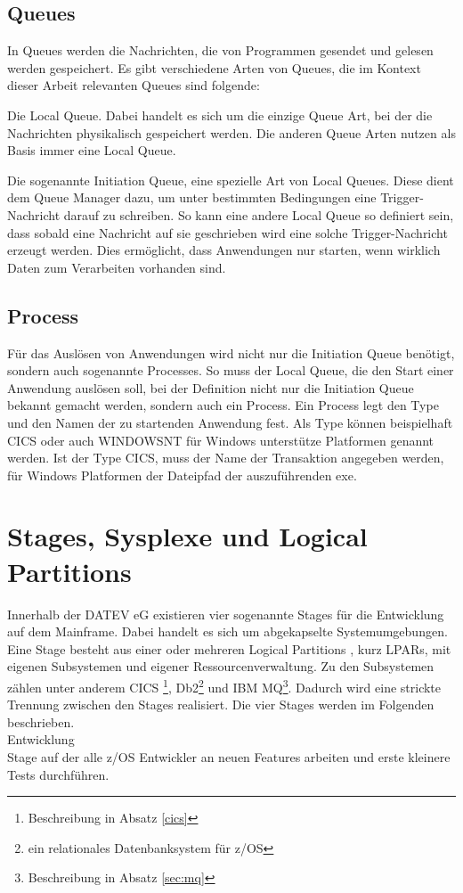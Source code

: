 \subsection{Queues}
In Queues werden die Nachrichten, die von Programmen gesendet und gelesen werden gespeichert.
Es gibt verschiedene Arten von Queues, die im Kontext dieser Arbeit relevanten Queues sind folgende:

Die Local Queue.
Dabei handelt es sich um die einzige Queue Art, bei der die Nachrichten physikalisch gespeichert werden.
Die anderen Queue Arten nutzen als Basis immer eine Local Queue.

Die sogenannte \glqq Initiation Queue\grqq, eine spezielle Art von Local Queues.
Diese dient dem Queue Manager dazu, um unter bestimmten Bedingungen eine Trigger-Nachricht darauf zu schreiben.
So kann eine andere Local Queue so definiert sein, dass sobald eine Nachricht auf sie geschrieben wird eine solche Trigger-Nachricht erzeugt werden.
Dies ermöglicht, dass Anwendungen nur starten, wenn wirklich Daten zum Verarbeiten vorhanden sind.
\cite{Aranha.2013}

\subsection{Process}
Für das Auslösen von Anwendungen wird nicht nur die Initiation Queue benötigt, sondern auch sogenannte \glqq Processes\grqq.
So muss der Local Queue, die den Start einer Anwendung auslösen soll, bei der Definition nicht nur die Initiation Queue bekannt gemacht werden, sondern auch ein Process.
Ein Process legt den \glqq Type\grqq{} und den Namen der zu startenden Anwendung fest.
Als \glqq Type\grqq{} können beispielhaft CICS oder auch WINDOWSNT für Windows unterstütze Platformen genannt werden.
Ist der \glqq Type\grqq{} CICS,  muss der Name der Transaktion angegeben werden, für Windows Platformen der Dateipfad der auszuführenden exe.
\cite{Aranha.2013}

\section{Stages, Sysplexe und Logical Partitions}
Innerhalb der DATEV eG existieren vier sogenannte \glqq Stages\grqq{} für die Entwicklung auf dem Mainframe.
Dabei handelt es sich um abgekapselte Systemumgebungen.
Eine Stage besteht aus einer oder mehreren \glqq Logical Partitions \grqq, kurz LPARs, mit eigenen Subsystemen und eigener Ressourcenverwaltung. 
Zu den Subsystemen zählen unter anderem CICS \footnote{Beschreibung in Absatz \ref{cics}},  Db2\footnote{ein relationales Datenbanksystem für z/OS} und IBM MQ\footnote{Beschreibung in Absatz \ref{sec:mq}}.
Dadurch wird eine strickte Trennung zwischen den Stages realisiert.
Die vier Stages werden im Folgenden beschrieben.\\
\glqq Entwicklung\grqq\\
Stage auf der alle z/OS Entwickler an neuen Features arbeiten und erste kleinere Tests durchführen.

